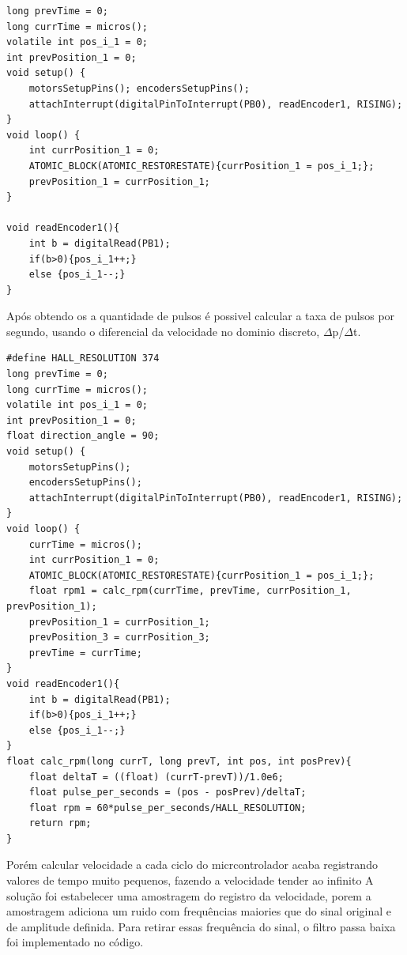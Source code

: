 \lstset{language=C}
\begin{lstlisting}
long prevTime = 0;
long currTime = micros();
volatile int pos_i_1 = 0;
int prevPosition_1 = 0;
void setup() {
    motorsSetupPins(); encodersSetupPins();
    attachInterrupt(digitalPinToInterrupt(PB0), readEncoder1, RISING);
}
void loop() {
	int currPosition_1 = 0;
    ATOMIC_BLOCK(ATOMIC_RESTORESTATE){currPosition_1 = pos_i_1;};
    prevPosition_1 = currPosition_1;
}

void readEncoder1(){ 
    int b = digitalRead(PB1);
    if(b>0){pos_i_1++;}
    else {pos_i_1--;}
}
\end{lstlisting}


Após obtendo os a quantidade de pulsos é possivel calcular a taxa de pulsos por segundo, usando o diferencial da velocidade no dominio discreto, $\Delta$p/$\Delta$t.

\lstset{language=C}
\begin{lstlisting}
#define HALL_RESOLUTION 374
long prevTime = 0;
long currTime = micros();
volatile int pos_i_1 = 0;
int prevPosition_1 = 0;
float direction_angle = 90;
void setup() {
    motorsSetupPins();
    encodersSetupPins();
    attachInterrupt(digitalPinToInterrupt(PB0), readEncoder1, RISING);  
}
void loop() {
	currTime = micros();
	int currPosition_1 = 0;
	ATOMIC_BLOCK(ATOMIC_RESTORESTATE){currPosition_1 = pos_i_1;};
	float rpm1 = calc_rpm(currTime, prevTime, currPosition_1, prevPosition_1);
	prevPosition_1 = currPosition_1;
	prevPosition_3 = currPosition_3;
	prevTime = currTime;
}
void readEncoder1(){ 
    int b = digitalRead(PB1);
    if(b>0){pos_i_1++;}
    else {pos_i_1--;}
}
float calc_rpm(long currT, long prevT, int pos, int posPrev){
    float deltaT = ((float) (currT-prevT))/1.0e6;
    float pulse_per_seconds = (pos - posPrev)/deltaT;
    float rpm = 60*pulse_per_seconds/HALL_RESOLUTION;
    return rpm;
}
\end{lstlisting}


Porém calcular velocidade a cada ciclo do micrcontrolador acaba registrando valores de tempo muito pequenos, fazendo a velocidade tender ao infinito
A solução foi estabelecer uma amostragem do registro da velocidade, porem a amostragem adiciona um ruido com frequências maiories que do sinal original e de amplitude definida.
Para retirar essas frequência do sinal, o filtro passa baixa foi implementado no código.



